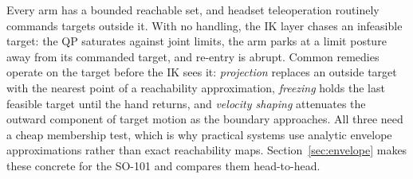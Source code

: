 Every arm has a bounded reachable set, and headset teleoperation
routinely commands targets outside it. With no handling, the IK layer
chases an infeasible target: the QP saturates against joint limits, the
arm parks at a limit posture away from its commanded target, and
re-entry is abrupt. Common remedies operate on the target before the IK
sees it: \emph{projection} replaces an outside target with the nearest
point of a reachability approximation, \emph{freezing} holds the last
feasible target until the hand returns, and \emph{velocity shaping}
attenuates the outward component of target motion as the boundary
approaches. All three need a cheap membership test, which is why
practical systems use analytic envelope approximations rather than exact
reachability maps. Section~\ref{sec:envelope} makes these concrete for
the SO-101 and compares them head-to-head.
